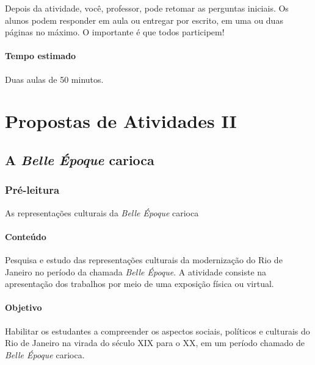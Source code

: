 \documentclass[12pt]{extarticle}
\begin{document}
Depois da atividade, você, professor, pode retomar as perguntas
iniciais. Os alunos podem responder em aula ou entregar por escrito, em
uma ou duas páginas no máximo. O importante é que todos participem!

\paragraph{Tempo estimado} Duas aulas de 50 minutos.



\section{Propostas de Atividades II}

\subsection{A \emph{Belle Époque} carioca}

\subsubsection{Pré-leitura} As representações culturais da \emph{Belle Époque} carioca



\paragraph{Conteúdo} Pesquisa e estudo das representações culturais da
modernização do Rio de Janeiro no período da chamada \emph{Belle
Époque}. A atividade consiste na apresentação dos trabalhos por meio de
uma exposição física ou virtual.

\paragraph{Objetivo} Habilitar os estudantes a compreender os aspectos
sociais, políticos e culturais do Rio de Janeiro na virada do século XIX
para o XX, em um período chamado de \emph{Belle Époque} carioca.


\end{document}
